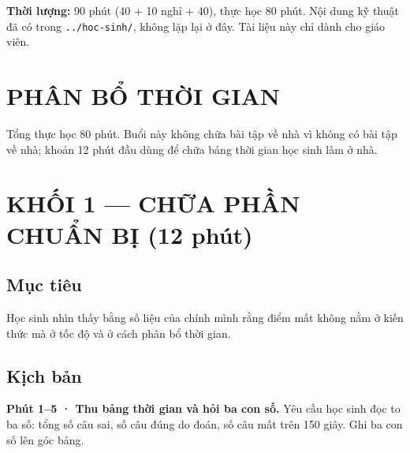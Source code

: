 \documentclass[11pt, a4paper]{article}
\begin{document}

\textbf{Thời lượng:} 90 phút (40 + 10 nghỉ + 40), thực học 80 phút. Nội dung kỹ thuật đã có trong \texttt{../hoc-sinh/}, không lặp lại ở đây. Tài liệu này chỉ dành cho giáo viên.

\section{PHÂN BỔ THỜI GIAN}


Tổng thực học 80 phút. Buổi này không chữa bài tập về nhà vì không có bài tập về nhà; khoản 12 phút đầu dùng để chữa bảng thời gian học sinh làm ở nhà.

\section{KHỐI 1 — CHỮA PHẦN CHUẨN BỊ (12 phút)}

\subsection{Mục tiêu}

Học sinh nhìn thấy bằng số liệu của chính mình rằng điểm mất không nằm ở kiến thức mà ở tốc độ và ở cách phân bổ thời gian.

\subsection{Kịch bản}

\textbf{Phút 1–5 · Thu bảng thời gian và hỏi ba con số.} Yêu cầu học sinh đọc to ba số: tổng số câu sai, số câu đúng do đoán, số câu mất trên 150 giây. Ghi ba con số lên góc bảng.
\end{document}
